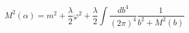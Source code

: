 \begin{equation}
M^{2}(\alpha)=m^{2}+\dfrac{\lambda}{2}\varphi^{2}+\frac{\lambda}{2}\int
\frac{db^{4}}{(2\pi)^{4}} \frac{1}{b^{2}+M^{2}(b)} \label{gcom}%
\end{equation}

